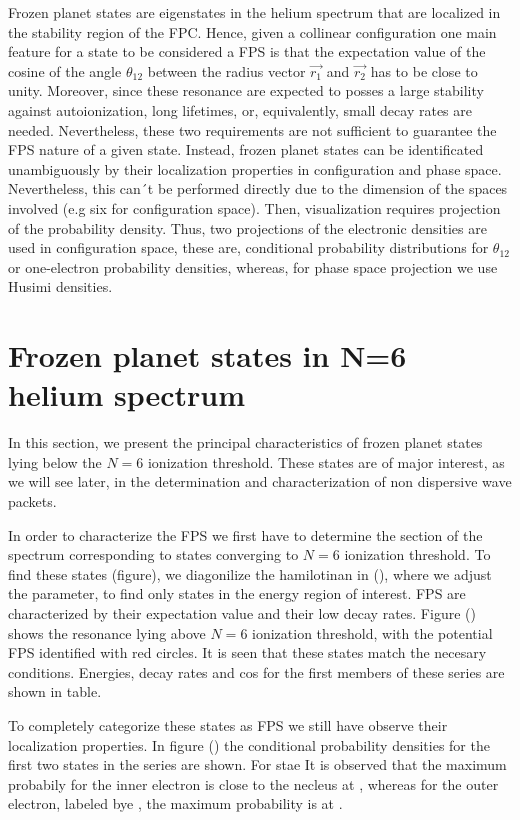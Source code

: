 Frozen planet states are eigenstates in the helium spectrum that are localized in the stability region of the FPC. Hence, given a collinear configuration one main feature for a state to be considered a FPS is that the expectation value of the cosine of the angle $ \theta_{12} $ between the radius vector $ \vec{r_{1}} $ and $ \vec{r_{2}} $ has to be close to unity. Moreover, since these resonance are expected to posses a large stability against autoionization, long lifetimes, or, equivalently, small decay rates are needed. Nevertheless, these two requirements are not sufficient to guarantee the FPS nature of a given state. Instead, frozen planet states can be identificated unambiguously by their localization properties in configuration and phase space. Nevertheless, this can´t be performed directly due to the dimension of the spaces involved (e.g six for configuration space). Then, visualization requires projection of the probability density. Thus, two projections of the electronic densities are used in configuration space, these are, conditional probability distributions for $ \theta_{12} $ or one-electron probability densities, whereas, for phase space projection we use Husimi densities.

\section{Frozen planet states in N=6 helium spectrum}

In this section, we present the principal characteristics of frozen planet states lying below the $ N=6 $ ionization threshold. These states are of major interest, as we will see later, in the determination and characterization of non dispersive wave packets.

In order to characterize the FPS we first have to determine the section of the spectrum corresponding to states converging to $ N=6 $ ionization threshold. To find these states (figure), we diagonilize the hamilotinan in (), where we adjust the parameter, to find only states in the energy region of interest. FPS are characterized by their expectation value and their low decay rates. Figure () shows the resonance lying above $ N=6 $ ionization threshold,  with the potential FPS identified with red circles. It is seen that these states match the necesary conditions. Energies, decay rates and cos for the first members of these series are shown in table.

To completely categorize these states as FPS we still have observe their localization properties. In figure () the conditional probability densities for the first two states in the series are shown. For stae It is observed that the maximum probabily for the inner electron is close to the necleus at , whereas for the outer electron, labeled bye , the maximum probability is at .

